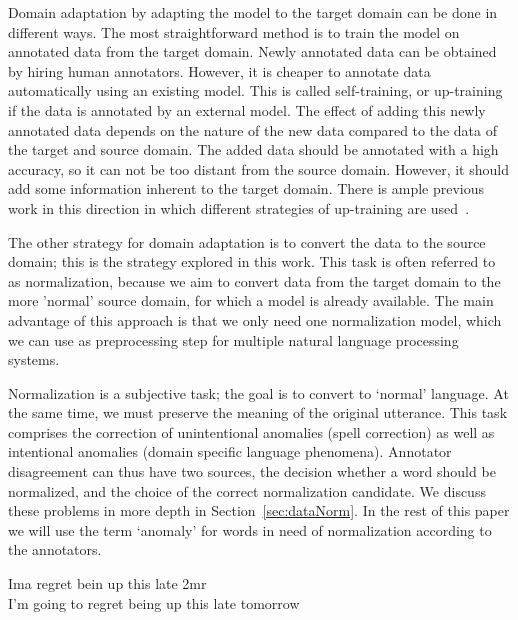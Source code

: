 \documentclass[a4paper,10pt,twoside]{article}
\begin{document}
Domain adaptation by adapting the model to the target domain can be done in
different ways. The most straightforward method is to train the model on
annotated data from the target domain. Newly annotated data can be obtained by
hiring human annotators. However, it is cheaper to annotate data automatically
using an existing model. This is called self-training, or up-training if
the data is annotated by an external model. The effect of adding this newly
annotated data depends on the nature of the new data compared to the data of
the target and source domain. The added data should be annotated with a high
accuracy, so it can not be too distant from the source domain. However, it
should add some information inherent to the target domain. There is ample
previous work in this direction in which different strategies of up-training
are
used~\cite{foster2011hardtoparse,khan-dickinson-kubler:2013:RANLP-2013,petrov2012overview}.

The other strategy for domain adaptation is to convert the data to the source
domain; this is the strategy explored in this work. This task is often referred
to as normalization, because we aim to convert data from the target domain to the
more 'normal' source domain, for which a model is already available. The main
advantage of this approach is that we only need one normalization model, which
we can use as preprocessing step for multiple natural language processing systems.

Normalization is a subjective task; the goal is to convert to `normal'
language. At the same time, we must preserve the meaning of the original
utterance. This task comprises the correction of unintentional anomalies (spell
correction) as well as intentional anomalies (domain specific language
phenomena).  Annotator disagreement can thus have two sources, the decision
whether a word should be normalized, and the choice of the correct
normalization candidate.  We discuss these problems in more depth in
Section~\ref{sec:dataNorm}. In the rest of this paper we will use the term 
`anomaly' for words in need of normalization according to the annotators.

\begin{exe}
    \ex
    \gll Ima regret bein up this late 2mr \\
    I'm going to regret being up this late tomorrow  \\
    \label{Tweet1}
\end{exe}
\end{document}
